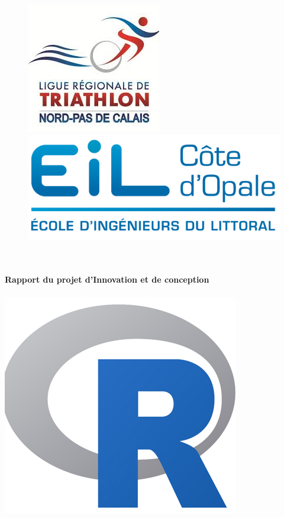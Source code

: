 \begin{titlepage}
  \begin{sffamily}
  \begin{center}
\begin{figure}
\includegraphics[scale=0.8]{img/logo_png.png} \hfill
\includegraphics[scale=0.7]{img/eilco.png} 
\end{figure}
    \textsc{\Large }\\[1.5cm]
    \HRule \\[0.4cm]
    { \huge \bfseries Rapport du projet d'Innovation et de conception\\[0.4cm] }
	\textsc{\Large}
    \HRule \\[2cm]
    \includegraphics[scale=0.5]{img/R_logo.png}\\[2cm]


\end{center}
\end{sffamily}
\end{titlepage}
